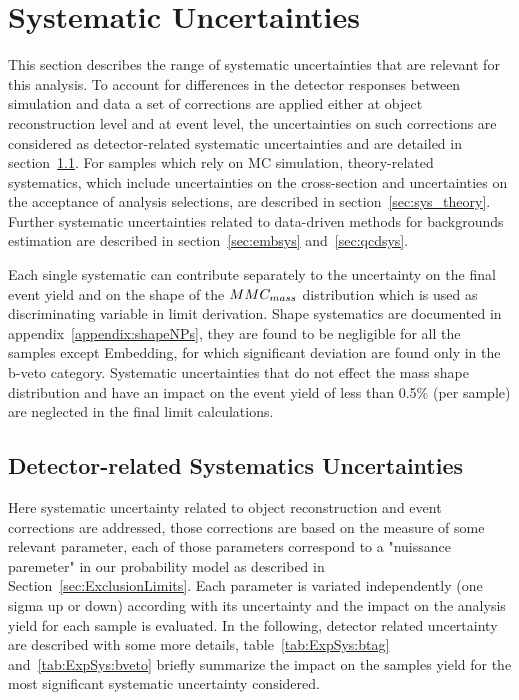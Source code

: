 \section{Systematic Uncertainties}
\label{sec:Systematics}

This section describes the range of systematic uncertainties
that are relevant for this analysis. To account for differences in the detector responses between simulation and data a 
set of corrections are applied either at object reconstruction level and at event level, 
the uncertainties on such corrections are considered as detector-related systematic 
uncertainties and are detailed in section~\ref{sec:sys:sys_det}. 
For samples which rely on MC simulation, theory-related
systematics, which include uncertainties on the cross-section and
uncertainties on the acceptance of analysis selections,  
are  described in section~\ref{sec:sys_theory}.
Further systematic uncertainties related to data-driven methods for backgrounds estimation
are described in section~\ref{sec:embsys} and~\ref{sec:qcdsys}.  

Each single systematic can contribute separately to the uncertainty on the
final event yield and on the shape of the $MMC_{mass}$
distribution which is used as discriminating variable in limit derivation. Shape systematics are
documented in appendix~\ref{appendix:shapeNPs}, they are found to be negligible for all the samples except
Embedding, for which significant deviation are found only in the b-veto category. 
Systematic uncertainties that do not effect the
mass shape distribution and have an impact on the event yield of less than 0.5\% (per sample) are 
neglected in the final limit calculations.


\subsection{Detector-related Systematics Uncertainties}
\label{sec:sys:sys_det}
Here systematic uncertainty related to object reconstruction and event 
corrections are addressed, those corrections are based on the measure of some relevant parameter, 
each of those parameters correspond to a "nuissance paremeter" in our probability model 
as described in Section~\ref{sec:ExclusionLimits}.
Each parameter is variated independently (one sigma up or down) according with its 
uncertainty and the impact on the analysis yield for each sample is evaluated.
In the following, detector related uncertainty are  described with some more details,
table~\ref{tab:ExpSys:btag} and~\ref{tab:ExpSys:bveto} briefly summarize the impact on the samples 
yield for the most significant systematic uncertainty considered. 



